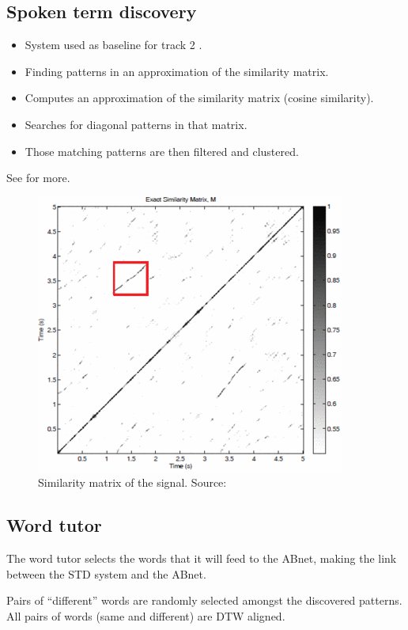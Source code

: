 \documentclass[final]{beamer}
\newcommand{\abnet}{{\sc ABnet}}
\begin{document}
\begin{frame}[t]
\begin{multicols}{3}

\subsection{Spoken term discovery}

\begin{itemize}
\item System used as baseline for track 2 \cite{versteeghetal2015}.
\item Finding patterns in an approximation of the similarity matrix.
\item Computes an approximation of the similarity matrix (cosine similarity).
\item Searches for diagonal patterns in that matrix.
\item Those matching patterns are then filtered and clustered.
\end{itemize}

See \cite{jansenvandurme2011} for more.

\begin{figure}[ht!]
  \begin{center}
    \includegraphics[width=0.3\columnwidth]{similarity_matrix}
    \caption{\label{fig:system}Similarity matrix of the signal. Source: \cite{jansenvandurme2011}}
  \end{center}
\end{figure}

\subsection{Word tutor}

\begin{itemsize}
\item The word tutor selects the words that it will feed to the \abnet{}, making the link between the STD system and the \abnet{}.
\item Pairs of ``different'' words are randomly selected amongst the discovered patterns. All pairs of words (same and different) are DTW aligned.


\end{itemsize}
\end{multicols}
\end{frame}
\end{document}
